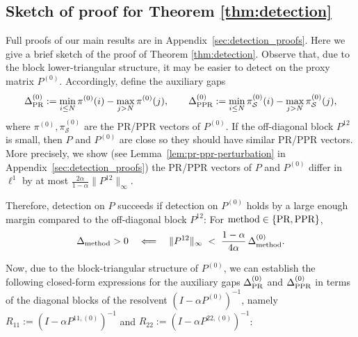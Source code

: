 \documentclass{article}
\theoremstyle{plain}
\theoremstyle{definition}
\begin{document}
\subsection{Sketch of proof for Theorem \ref{thm:detection}}\label{sec:lemmas}
	\vspace{-0.2cm}
Full proofs of our main results are in Appendix~\ref{sec:detection_proofs}. Here we give a brief sketch of the proof of Theorem \ref{thm:detection}. Observe that, due to the block lower-triangular structure, it may be easier to detect on the proxy matrix  $P^{(0)}$. Accordingly, define the auxiliary gaps 
\begin{equation}\label{eq:delta0-defs}
	\Delta^{(0)}_{\textnormal{PR}} := \min_{i\leq N}\pi^{(0)}(i) - \max_{j > N}\pi^{(0)}(j), \qquad
	\Delta^{(0)}_{\textnormal{PPR}} := \min_{i\leq N}\pi^{(0)}_{\mathcal{S}}(i) - \max_{j > N}\pi^{(0)}_{\mathcal{S}}(j),
\end{equation}
where $\pi^{(0)}, \pi^{(0)}_{\mathcal{S}}$ are the PR/PPR vectors of $P^{(0)}$. 
If the off-diagonal block $P^{12}$ is small, then $P$ and $P^{(0)}$ are close so they should have similar PR/PPR vectors. More precisely, we show (see Lemma~\ref{lem:pr-ppr-perturbation} in  Appendix~\ref{sec:detection_proofs})  the PR/PPR vectors of $P$ and $P^{(0)}$ differ in $\ell^1$ by at most $\frac{2\alpha}{1-\alpha}\|P^{12}\|_\infty$. 

Therefore, detection on $P$ succeeds if detection on $P^{(0)}$ holds by a large enough margin compared to the off-diagonal block $P^{12}$: For $\textup{method}\in \{ \textup{PR}, \textup{PPR} \}$, 
\begin{align}\label{eq:detection_reduction}
	\Delta_{\textup{method}} > 0 \quad  \Longleftarrow  \quad \|P^{12}\|_\infty \;<\; \frac{1-\alpha}{4\alpha}\,\Delta^{(0)}_{\textnormal{method}}. 
\end{align}

Now, due to the block-triangular structure of $P^{(0)}$, we can establish the following closed-form expressions for the auxiliary gaps $\Delta^{(0)}_{\textnormal{PR}}$ and $\Delta^{(0)}_{\textnormal{PPR}}$ in terms of the diagonal blocks of the resolvent $(I - \alpha P^{(0)})^{-1}$, namely $R_{11} := (I - \alpha P^{11,(0)})^{-1}$ and $R_{22} := (I - \alpha P^{22,(0)})^{-1}$: 
\end{document}
